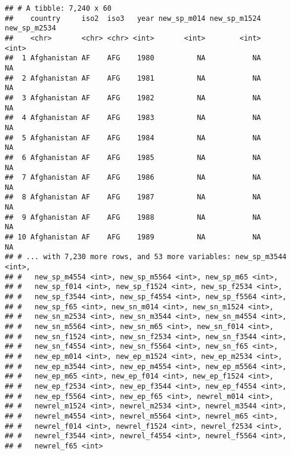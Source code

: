 \documentclass[]{article}
\begin{document}
\begin{verbatim}
## # A tibble: 7,240 x 60
##    country     iso2  iso3   year new_sp_m014 new_sp_m1524 new_sp_m2534
##    <chr>       <chr> <chr> <int>       <int>        <int>        <int>
##  1 Afghanistan AF    AFG    1980          NA           NA           NA
##  2 Afghanistan AF    AFG    1981          NA           NA           NA
##  3 Afghanistan AF    AFG    1982          NA           NA           NA
##  4 Afghanistan AF    AFG    1983          NA           NA           NA
##  5 Afghanistan AF    AFG    1984          NA           NA           NA
##  6 Afghanistan AF    AFG    1985          NA           NA           NA
##  7 Afghanistan AF    AFG    1986          NA           NA           NA
##  8 Afghanistan AF    AFG    1987          NA           NA           NA
##  9 Afghanistan AF    AFG    1988          NA           NA           NA
## 10 Afghanistan AF    AFG    1989          NA           NA           NA
## # ... with 7,230 more rows, and 53 more variables: new_sp_m3544 <int>,
## #   new_sp_m4554 <int>, new_sp_m5564 <int>, new_sp_m65 <int>,
## #   new_sp_f014 <int>, new_sp_f1524 <int>, new_sp_f2534 <int>,
## #   new_sp_f3544 <int>, new_sp_f4554 <int>, new_sp_f5564 <int>,
## #   new_sp_f65 <int>, new_sn_m014 <int>, new_sn_m1524 <int>,
## #   new_sn_m2534 <int>, new_sn_m3544 <int>, new_sn_m4554 <int>,
## #   new_sn_m5564 <int>, new_sn_m65 <int>, new_sn_f014 <int>,
## #   new_sn_f1524 <int>, new_sn_f2534 <int>, new_sn_f3544 <int>,
## #   new_sn_f4554 <int>, new_sn_f5564 <int>, new_sn_f65 <int>,
## #   new_ep_m014 <int>, new_ep_m1524 <int>, new_ep_m2534 <int>,
## #   new_ep_m3544 <int>, new_ep_m4554 <int>, new_ep_m5564 <int>,
## #   new_ep_m65 <int>, new_ep_f014 <int>, new_ep_f1524 <int>,
## #   new_ep_f2534 <int>, new_ep_f3544 <int>, new_ep_f4554 <int>,
## #   new_ep_f5564 <int>, new_ep_f65 <int>, newrel_m014 <int>,
## #   newrel_m1524 <int>, newrel_m2534 <int>, newrel_m3544 <int>,
## #   newrel_m4554 <int>, newrel_m5564 <int>, newrel_m65 <int>,
## #   newrel_f014 <int>, newrel_f1524 <int>, newrel_f2534 <int>,
## #   newrel_f3544 <int>, newrel_f4554 <int>, newrel_f5564 <int>,
## #   newrel_f65 <int>
\end{verbatim}
\end{document}

